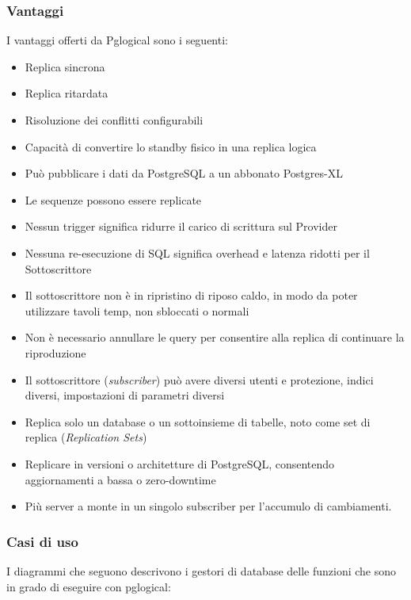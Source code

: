 \subsubsection{Vantaggi}
I vantaggi offerti da Pglogical sono i seguenti:
\begin{itemize}
\item
Replica sincrona
\item
Replica ritardata
\item
Risoluzione dei conflitti configurabili
\item
Capacit\`{a} di convertire lo standby fisico in una replica logica
\item
Pu\`{o} pubblicare i dati da PostgreSQL a un abbonato Postgres-XL
\item
Le sequenze possono essere replicate
\item
Nessun trigger significa ridurre il carico di scrittura sul Provider
\item
Nessuna re-esecuzione di SQL significa overhead e latenza ridotti per il Sottoscrittore
\item
Il sottoscrittore non \`{e} in ripristino di riposo caldo, in modo da poter utilizzare tavoli temp, non sbloccati o normali
\item
Non \`{e} necessario annullare le query per consentire alla replica di continuare la riproduzione
\item
Il sottoscrittore (\textit{subscriber}) pu\`{o} avere diversi utenti e protezione, indici diversi, impostazioni di parametri diversi
\item
Replica solo un database o un sottoinsieme di tabelle, noto come set di replica (\textit{Replication Sets})
\item
Replicare in versioni o architetture di PostgreSQL, consentendo aggiornamenti a bassa o zero-downtime
\item
Pi\`{u} server a monte in un singolo subscriber per l'accumulo di cambiamenti.\cite{etichetta3}
\end{itemize}

\subsubsection{Casi di uso}
I diagrammi che seguono descrivono i gestori di database delle funzioni che sono in grado di eseguire con pglogical:

